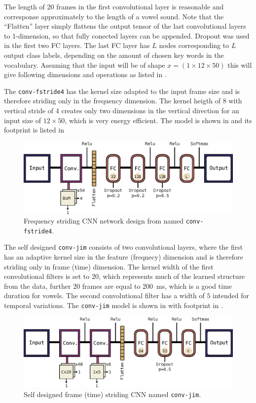 The length of 20 frames in the first convolutional layer is reasonable and corresponse approximately to the length of a vowel sound.
Note that the \enquote{Flatten} layer simply flattens the output tensor of the last convolutional layers to 1-dimension, so that fully conected layers can be appended.
Dropout was used in the first two FC layers.
The last FC layer has $L$ nodes corresponding to $L$ output class labels, depending on the amount of chosen key words in the vocabulary.
Assuming that the input will be of shape $x = (1 \times 12 \times 50)$ this will give following dimensions and operations as listed in .


The \texttt{conv-fstride4} has the kernel size adapted to the input frame size and is therefore striding only in the frequency dimension.
The kernel heigth of 8 with vertical stride of 4 creates only two dimensions in the vertical direction for an input size of $12 \times 50$, which is very energy efficient. 
The model is shown in  and its footprint is listed in 
\begin{figure}[!ht]
  \centering
    \includegraphics[height=0.2\textwidth]{./4_nn/figs/nn_arch_cnn_fstride.eps}
  \caption{Frequency striding CNN network design from \cite{Sainath2015} named \texttt{conv-fstride4}.}
  \label{fig:nn_arch_cnn_fstride}
\end{figure}
\FloatBarrier
\noindent

The self designed \texttt{conv-jim} consists of two convolutional layers, where the first has an adaptive kernel size in the feature (freqnecy) dimension and is therefore striding only in frame (time) dimension.
The kernel width of the first convolutional filters is set to $20$, which represents much of the learned structure from the data, further $20$ frames are equal to \SI{200}{\milli\second}, which is a good time duration for vowels.
The second convolutional filter has a width of $5$ intended for temporal variations.
The \texttt{conv-jim} model is shown in  with footprint in .
\begin{figure}[!ht]
  \centering
    \includegraphics[height=0.2\textwidth]{./4_nn/figs/nn_arch_cnn_conv-jim.eps}
  \caption{Self designed frame (time) striding CNN named \texttt{conv-jim}.}
  \label{fig:nn_arch_cnn_conv-jim}
\end{figure}
\FloatBarrier
\noindent



